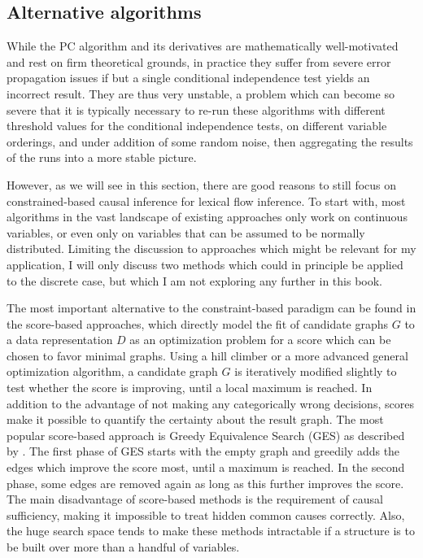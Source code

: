 \subsection{Alternative algorithms}
While the PC algorithm and its derivatives are mathematically well-motivated and rest on firm theoretical grounds, in practice they suffer from severe error propagation issues if but a single conditional independence test yields an incorrect result. They are thus very unstable, a problem which can become so severe that it is typically necessary to re-run these algorithms with different threshold values for the conditional independence tests, on different variable orderings, and under addition of some random noise, then aggregating the results of the runs into a more stable picture.

However, as we will see in this section, there are good reasons to still focus on constrained-based causal inference for lexical flow inference. To start with, most algorithms in the vast landscape of existing approaches only work on continuous variables, or even only on variables that can be assumed to be normally distributed. Limiting the discussion to approaches which might be relevant for my application, I will only discuss two methods which could in principle be applied to the discrete case, but which I am not exploring any further in this book.

The most important alternative to the constraint-based paradigm can be found in the score-based approaches, which directly model the fit of candidate graphs $G$ to a data representation $D$ as an optimization problem for a score which can be chosen to favor minimal graphs. Using a hill climber or a more advanced general optimization algorithm, a candidate graph $G$ is iteratively modified slightly to test whether the score is improving, until a local maximum is reached. In addition to the advantage of not making any categorically wrong decisions, scores make it possible to quantify the certainty about the result graph. The most popular score-based approach is Greedy Equivalence Search (GES) as described by \cite{chickering2002}. The first phase of GES starts with the empty graph and greedily adds the edges which improve the score most, until a maximum is reached. In the second phase, some edges are removed again as long as this further improves the score. The main disadvantage of score-based methods is the requirement of causal sufficiency, making it impossible to treat hidden common causes correctly. Also, the huge search space tends to make these methods intractable if a structure is to be built over more than a handful of variables.

